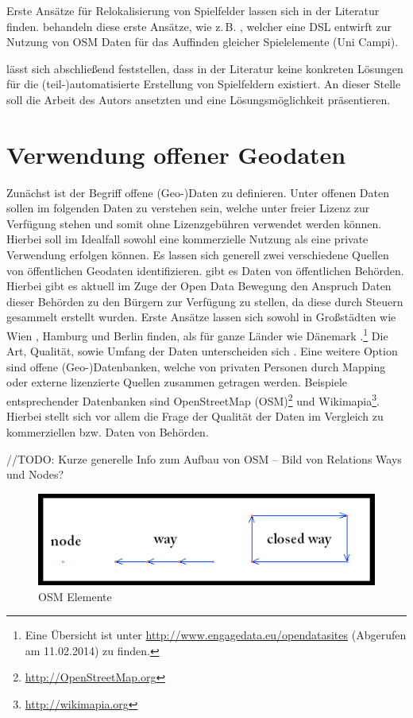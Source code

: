 Erste Ansätze für Relokalisierung von Spielfelder lassen sich in der Literatur finden. behandeln diese erste Ansätze, wie z.\,B. \citep{Mannara.2012}, welcher eine DSL entwirft zur Nutzung von OSM Daten für das Auffinden gleicher Spielelemente (Uni Campi).

lässt sich abschließend feststellen, dass in der Literatur keine konkreten Lösungen für die (teil-)automatisierte Erstellung von Spielfeldern existiert.
An dieser Stelle soll die Arbeit des Autors ansetzten und eine Lösungsmöglichkeit präsentieren.

\section{Verwendung offener Geodaten}
\label{ch3:s:offeneGeodaten}

Zunächst ist der Begriff offene (Geo-)Daten zu definieren.
Unter offenen Daten sollen im folgenden Daten zu verstehen sein, welche unter freier Lizenz zur Verfügung stehen und somit ohne Lizenzgebühren verwendet werden können. Hierbei soll im Idealfall sowohl eine kommerzielle Nutzung als eine private Verwendung erfolgen können.
Es lassen sich generell zwei verschiedene Quellen von öffentlichen Geodaten identifizieren.
gibt es Daten von öffentlichen Behörden. Hierbei gibt es aktuell im Zuge der Open Data Bewegung \cite{Oreilly.2007} den Anspruch Daten dieser Behörden zu den Bürgern zur Verfügung zu stellen, da diese durch Steuern gesammelt erstellt wurden. Erste Ansätze lassen sich sowohl in Großstädten wie Wien \cite{Wien.2014}, Hamburg \cite{Hamburg.2014} und Berlin \cite{Berlin.2014} finden, als für ganze Länder wie Dänemark \cite{Denmark.2014}.\footnote{Eine Übersicht ist unter \url{http://www.engagedata.eu/opendatasites} (Abgerufen am 11.02.2014) zu finden. } Die Art, Qualität, sowie Umfang der Daten unterscheiden sich . 
Eine weitere Option sind offene (Geo-)Datenbanken, welche von privaten Personen durch Mapping oder externe lizenzierte Quellen zusammen getragen werden.
Beispiele entsprechender Datenbanken sind OpenStreetMap (OSM)\footnote{\url{http://OpenStreetMap.org}} und Wikimapia\footnote{\url{http://wikimapia.org}}.
Hierbei stellt sich vor allem die Frage der Qualität der Daten im Vergleich zu kommerziellen bzw. Daten von Behörden.

//TODO: Kurze generelle Info zum Aufbau von OSM -- Bild von Relations Ways und Nodes?

\begin{figure}[H]
\begin{center}
\includegraphics[width=120mm]{images/ch3_img03_OSM1.png}
\caption{OSM Elemente}
\label{img:ch03_img03_OSM1}
\end{center}
\end{figure}

